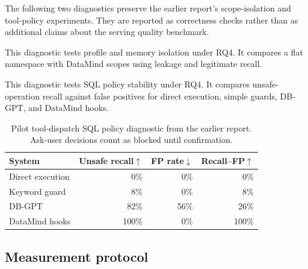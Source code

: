 The following two diagnostics preserve the earlier report's scope-isolation
and tool-policy experiments. They are reported as correctness checks rather
than as additional claims about the serving quality benchmark.

This diagnostic tests profile and memory isolation under RQ4. It compares a flat namespace with DataMind scopes using leakage and legitimate recall.

\begin{table}[t]
\centering\footnotesize
\caption{Pilot profile-scoped memory isolation diagnostic from the earlier
report.}
\label{tab:rq4-memory}
\scriptsize
\setlength{\tabcolsep}{4pt}
\end{table}

This diagnostic tests SQL policy stability under RQ4. It compares unsafe-operation recall against false positives for direct execution, simple guards, DB-GPT, and DataMind hooks.

\begin{table}[t]
\centering\footnotesize
\caption{Pilot tool-dispatch SQL policy diagnostic from the earlier report.
Ask-user decisions count as blocked until confirmation.}
\label{tab:rq4-policy}
\begin{tabular}{@{}lrrr@{}}
\toprule
System & Unsafe recall$\uparrow$ & FP rate$\downarrow$ & Recall--FP$\uparrow$ \\
\midrule
Direct execution & 0\% & 0\% & 0\% \\
Keyword guard & 8\% & 0\% & 8\% \\
DB-GPT & 82\% & 56\% & 26\% \\
DataMind hooks & 100\% & 0\% & 100\% \\
\bottomrule
\end{tabular}
\end{table}





\subsection{Measurement protocol}
\label{sec:eval-protocol}

